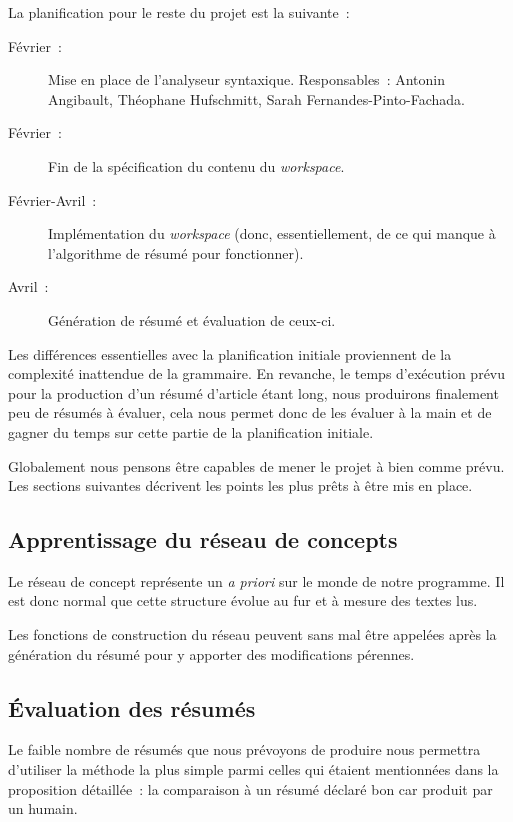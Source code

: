 \documentclass[a4paper, 12pt]{article}
\begin{document}
\vspace{1\baselineskip}

La planification pour le reste du projet est la suivante~:
\begin{description}
	\item[Février~: ]Mise en place de l'analyseur syntaxique. Responsables~: Antonin Angibault, Théophane Hufschmitt, Sarah Fernandes-Pinto-Fachada.
	\item[Février~: ]Fin de la spécification du contenu du \textit{workspace}.
	\item[Février-Avril~: ]Implémentation du \textit{workspace} (donc, essentiellement, de ce qui manque à l'algorithme de résumé pour fonctionner).
	\item[Avril~: ]Génération de résumé et évaluation de ceux-ci.
\end{description}

Les différences essentielles avec la planification initiale proviennent de la complexité inattendue de la grammaire. En revanche, le temps d'exécution prévu pour la production d'un résumé d'article étant long, nous produirons finalement peu de résumés à évaluer, cela nous permet donc de les évaluer à la main et de gagner du temps sur cette partie de la planification initiale.

Globalement nous pensons être capables de mener le projet à bien comme prévu. Les sections suivantes décrivent les points les plus prêts à être mis en place.

\subsection{Apprentissage du réseau de concepts}
Le réseau de concept représente un \textit{a priori} sur le monde de notre programme. Il est donc normal que cette structure évolue au fur et à mesure des textes lus.

Les fonctions de construction du réseau peuvent sans mal être appelées après la génération du résumé pour y apporter des modifications pérennes.

\subsection{\'Evaluation des résumés}
Le faible nombre de résumés que nous prévoyons de produire nous permettra d'utiliser la méthode la plus simple parmi celles qui étaient mentionnées dans la proposition détaillée~: la comparaison à un résumé déclaré bon car produit par un humain.
\end{document}
